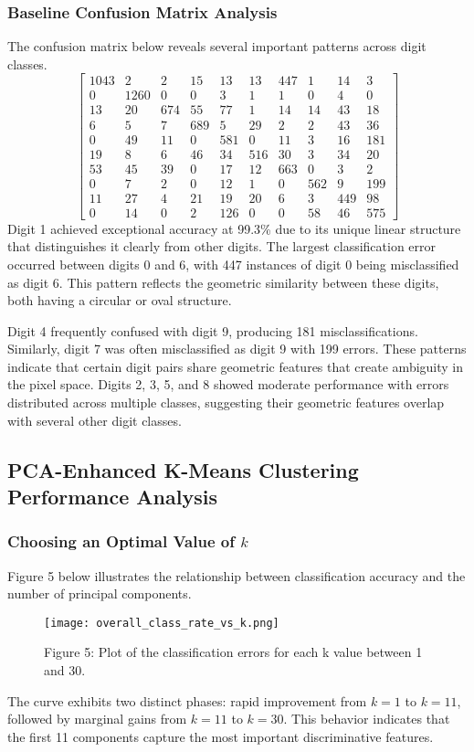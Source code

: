 \documentclass{article}
\begin{document}
\subsubsection{Baseline Confusion Matrix Analysis}
The confusion matrix below reveals several important patterns across digit classes.
\[
\begin{bmatrix}
1043 & 2 & 2 & 15 & 13 & 13 & 447 & 1 & 14 & 3\\
0 & 1260 & 0 & 0 & 3 & 1 & 1 & 0 & 4 & 0\\
13 & 20 & 674 & 55 & 77 & 1 & 14 & 14 & 43 & 18\\
6 & 5 & 7 & 689 & 5 & 29 & 2 & 2 & 43 & 36\\
0 & 49 & 11 & 0 & 581 & 0 & 11 & 3 & 16 & 181\\
19 & 8 & 6 & 46 & 34 & 516 & 30 & 3 & 34 & 20\\
53 & 45 & 39 & 0 & 17 & 12 & 663 & 0 & 3 & 2\\
0 & 7 &2 & 0 & 12 & 1 & 0 & 562 & 9 & 199\\
11 & 27 & 4 & 21 & 19 & 20 & 6 & 3 & 449 & 98\\
0 & 14 & 0 & 2 & 126 & 0 & 0 & 58 & 46 & 575
\end{bmatrix}
\]
Digit 1 achieved exceptional accuracy at 99.3\% due to its unique linear structure that distinguishes it clearly from other digits. The largest classification error occurred between digits 0 and 6, with 447 instances of digit 0 being misclassified as digit 6. This pattern reflects the geometric similarity between these digits, both having a circular or oval structure.

Digit 4 frequently confused with digit 9, producing 181 misclassifications. Similarly, digit 7 was often misclassified as digit 9 with 199 errors. These patterns indicate that certain digit pairs share geometric features that create ambiguity in the pixel space. Digits 2, 3, 5, and 8 showed moderate performance with errors distributed across multiple classes, suggesting their geometric features overlap with several other digit classes.
\subsection{PCA-Enhanced K-Means Clustering Performance Analysis}
\subsubsection{Choosing an Optimal Value of $k$}
Figure 5 below illustrates the relationship between classification accuracy and the number of principal components.
\begin{figure}[H]
  \centering
  \texttt{[image: overall\_class\_rate\_vs\_k.png]}
  \caption*{Figure 5: Plot of the classification errors for each k value between 1 and 30.}
\end{figure}
The curve exhibits two distinct phases: rapid improvement from $k = 1$ to $k = 11$, followed by marginal gains from $k = 11$ to $k = 30$. This behavior indicates that the first 11 components capture the most important discriminative features.
\end{document}
